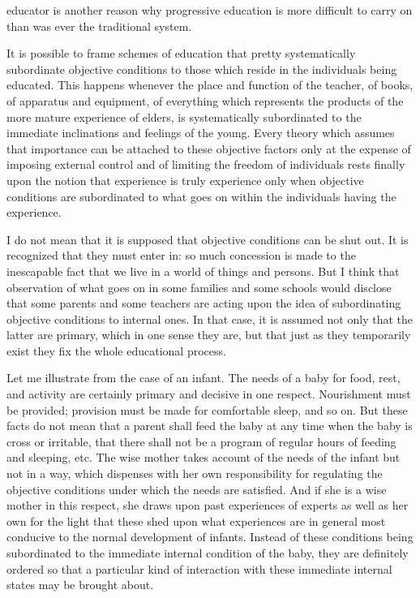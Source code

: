 educator is another reason why progressive education is more difficult to carry on than 
was ever the traditional system. 

It is possible to frame schemes of education that pretty systematically subordinate 
objective conditions to those which reside in the individuals being educated. This 
happens whenever the place and function of the teacher, of books, of apparatus and 
equipment, of everything which represents the products of the more mature experience of 
elders, is systematically subordinated to the immediate inclinations and feelings of the 
young. Every theory which assumes that importance can be attached to these objective 
factors only at the expense of imposing external control and of limiting the freedom of 
individuals rests finally upon the notion that experience is truly experience only when 
objective conditions are subordinated to what goes on within the individuals having the 
experience. 

I do not mean that it is supposed that objective conditions can be shut out. It is 
recognized that they must enter in: so much concession is made to the inescapable fact 
that we live in a world of things and persons. But I think that observation of what goes on 
in some families and some schools would disclose that some parents and some teachers 
are acting upon the idea of subordinating objective conditions to internal ones. In that 
case, it is assumed not only that the latter are primary, which in one sense they are, but 
that just as they temporarily exist they fix the whole educational process. 

Let me illustrate from the case of an infant. The needs of a baby for food, rest, and 
activity are certainly primary and decisive in one respect. Nourishment must be provided; 
provision must be made for comfortable sleep, and so on. But these facts do not mean 
that a parent shall feed the baby at any time when the baby is cross or irritable, that there 
shall not be a program of regular hours of feeding and sleeping, etc. The wise mother 
takes account of the needs of the infant but not in a way, which dispenses with her own 
responsibility for regulating the objective conditions under which the needs are satisfied. 
And if she is a wise mother in this respect, she draws upon past experiences of experts as 
well as her own for the light that these shed upon what experiences are in general most 
conducive to the normal development of infants. Instead of these conditions being 
subordinated to the immediate internal condition of the baby, they are definitely ordered 
so that a particular kind of interaction with these immediate internal states may be 
brought about. 

